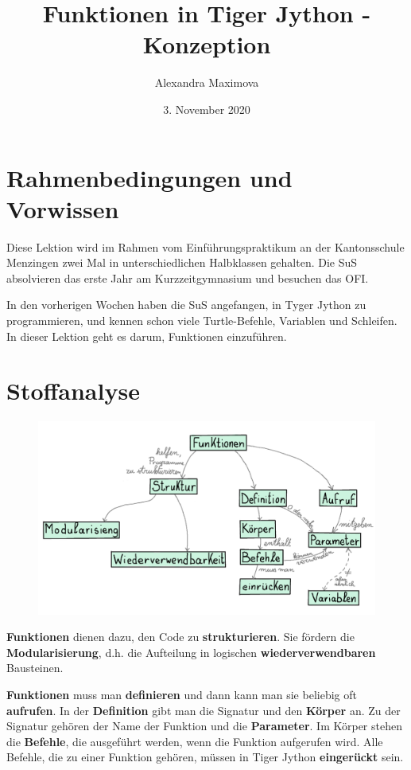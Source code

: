 \documentclass{article}
\title{Funktionen in Tiger Jython - Konzeption}
\author{Alexandra Maximova}
\date{3. November 2020}
\begin{document}
\maketitle
\section{Rahmenbedingungen und Vorwissen}
Diese Lektion wird im Rahmen vom Einführungspraktikum an der Kantonsschule Menzingen zwei Mal in unterschiedlichen Halbklassen gehalten. Die SuS absolvieren das erste Jahr am Kurzzeitgymnasium und besuchen das OFI.

In den vorherigen Wochen haben die SuS angefangen, in Tyger Jython zu programmieren, und kennen schon viele Turtle-Befehle, Variablen und Schleifen. In dieser Lektion geht es darum, Funktionen einzuführen.

\section{Stoffanalyse}
\begin{figure}[H]
\centering
\includegraphics[width=\linewidth]{pictures/ConceptMap.png}
\end{figure}

\textbf{Funktionen} dienen dazu, den Code zu \textbf{strukturieren}. Sie fördern die \textbf{Modularisierung}, d.h. die Aufteilung in logischen \textbf{wiederverwendbaren} Bausteinen.

\textbf{Funktionen} muss man \textbf{definieren} und dann kann man sie beliebig oft \textbf{aufrufen}. In der \textbf{Definition} gibt man die Signatur und den \textbf{Körper} an. Zu der Signatur gehören der Name der Funktion und die \textbf{Parameter}. Im Körper stehen die \textbf{Befehle}, die ausgeführt werden, wenn die Funktion aufgerufen wird. Alle Befehle, die zu einer Funktion gehören, müssen in Tiger Jython \textbf{eingerückt} sein.
\end{document}
